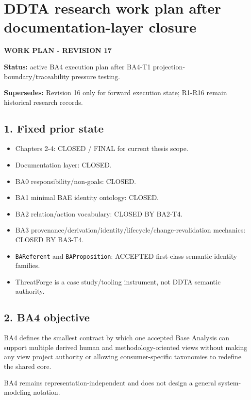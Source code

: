 \documentclass[11pt,a4paper]{article}
\providecommand{\tightlist}{\setlength{\itemsep}{0pt}\setlength{\parskip}{0pt}}
\begin{document}
\section{DDTA research work plan after documentation-layer closure}\label{ddta-research-work-plan-after-documentation-layer-closure}

\textbf{WORK PLAN - REVISION 17}

\textbf{Status:} active BA4 execution plan after BA4-T1 projection-boundary/traceability pressure testing.

\textbf{Supersedes:} Revision 16 only for forward execution state; R1-R16 remain historical research records.

\subsection{1. Fixed prior state}\label{1-fixed-prior-state}

\begin{itemize}
\tightlist
\item
  Chapters 2-4: CLOSED / FINAL for current thesis scope.
\item
  Documentation layer: CLOSED.
\item
  BA0 responsibility/non-goals: CLOSED.
\item
  BA1 minimal BAE identity ontology: CLOSED.
\item
  BA2 relation/action vocabulary: CLOSED BY BA2-T4.
\item
  BA3 provenance/derivation/identity/lifecycle/change-revalidation mechanics: CLOSED BY BA3-T4.
\item
  \texttt{BAReferent} and \texttt{BAProposition}: ACCEPTED first-class semantic identity families.
\item
  ThreatForge is a case study/tooling instrument, not DDTA semantic authority.
\end{itemize}

\subsection{2. BA4 objective}\label{2-ba4-objective}

BA4 defines the smallest contract by which one accepted Base Analysis can support multiple derived human and methodology-oriented views without making any view project authority or allowing consumer-specific taxonomies to redefine the shared core.

BA4 remains representation-independent and does not design a general system-modeling notation.
\end{document}
